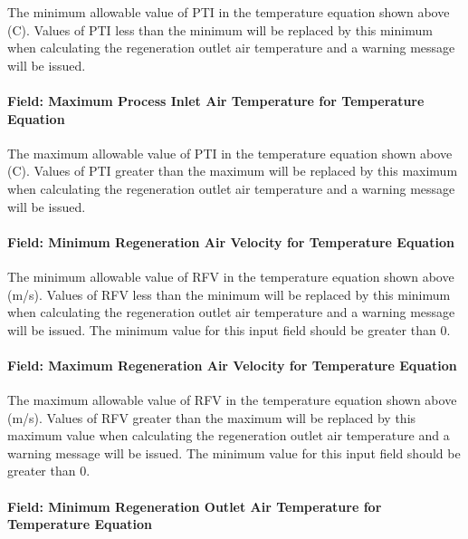 The minimum allowable value of PTI in the temperature equation shown above (C). Values of PTI less than the minimum will be replaced by this minimum when calculating the regeneration outlet air temperature and a warning message will be issued.

\paragraph{Field: Maximum Process Inlet Air Temperature for Temperature Equation}\label{field-maximum-process-inlet-air-temperature-for-temperature-equation}

The maximum allowable value of PTI in the temperature equation shown above (C). Values of PTI greater than the maximum will be replaced by this maximum when calculating the regeneration outlet air temperature and a warning message will be issued.

\paragraph{Field: Minimum Regeneration Air Velocity for Temperature Equation}\label{field-minimum-regeneration-air-velocity-for-temperature-equation}

The minimum allowable value of RFV in the temperature equation shown above (m/s). Values of RFV less than the minimum will be replaced by this minimum when calculating the regeneration outlet air temperature and a warning message will be issued. The minimum value for this input field should be greater than 0.

\paragraph{Field: Maximum Regeneration Air Velocity for Temperature Equation}\label{field-maximum-regeneration-air-velocity-for-temperature-equation}

The maximum allowable value of RFV in the temperature equation shown above (m/s). Values of RFV greater than the maximum will be replaced by this maximum value when calculating the regeneration outlet air temperature and a warning message will be issued. The minimum value for this input field should be greater than 0.

\paragraph{Field: Minimum Regeneration Outlet Air Temperature for Temperature Equation}\label{field-minimum-regeneration-outlet-air-temperature-for-temperature-equation}

